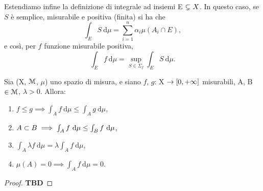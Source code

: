 \documentclass[Completo.tex]{subfiles}
\begin{document}
\begin{Def}
	Estendiamo infine la definizione di integrale ad insiemi E $\subsetneq X$. In questo caso, se $S$ è semplice, misurabile e positiva (finita) si ha che
	\begin{equation*}
		\int_E S \ \mathrm{d}\mu = \sum_{i = 1}^{n} \alpha_i \mu(A_i \cap E),
	\end{equation*}
	e così, per $f$ funzione misurabile positiva,
	\begin{equation*}
	\int_E f \ \mathrm{d}\mu = \sup\limits_{S \in \Sigma_f} \int_E S \ \mathrm{d}\mu.
	\end{equation*}
\end{Def}
\begin{Prop}
	Sia (X, $\eu[M]$, $\mu$) uno spazio di misura, e siano $f$, $g$: X $\rightarrow [0, +\infty]$ misurabili, A, B $\in \eu[M]$, $\lambda > 0$. Allora:
	\begin{enumerate}
		\item $f \leq g \implies \int_A f \ \mathrm{d}\mu \leq \int_A g \ \mathrm{d}\mu$,
		\item $A \sset B \implies \int_A f \ \mathrm{d}\mu \leq \int_B f \ \mathrm{d}\mu$,
		\item $\int_A \lambda f \ \mathrm{d}\mu = \lambda \int_A f \ \mathrm{d}\mu$,
		\item $\mu(A) = 0 \implies \int_A f \ \mathrm{d}\mu = 0$.
	\end{enumerate}
\end{Prop}
\begin{proof}
	\textbf{TBD}
\end{proof}
\end{document}
